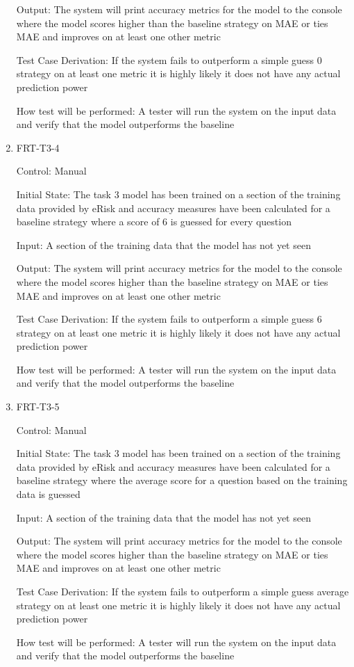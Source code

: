 \documentclass[12pt, titlepage]{article}
\begin{document}
\begin{enumerate}
Output: The system will print accuracy metrics for the model to the console where the model scores higher than the baseline strategy on MAE or ties MAE and improves on at least one other metric

Test Case Derivation: If the system fails to outperform a simple guess 0 strategy on at least one metric it is highly likely it does not have any actual prediction power

How test will be performed: A tester will run the system on the input data and verify that the model outperforms the baseline

\item{FRT-T3-4\\}

Control: Manual

Initial State: The task 3 model has been trained on a section of the training data provided by eRisk and accuracy measures have been calculated for a baseline strategy where a score of 6 is guessed for every question

Input: A section of the training data that the model has not yet seen

Output: The system will print accuracy metrics for the model to the console where the model scores higher than the baseline strategy on MAE or ties MAE and improves on at least one other metric

Test Case Derivation: If the system fails to outperform a simple guess 6 strategy on at least one metric it is highly likely it does not have any actual prediction power

How test will be performed: A tester will run the system on the input data and verify that the model outperforms the baseline

\item{FRT-T3-5\\}

Control: Manual

Initial State: The task 3 model has been trained on a section of the training data provided by eRisk and accuracy measures have been calculated for a baseline strategy where the average score for a question based on the training data is guessed

Input: A section of the training data that the model has not yet seen

Output: The system will print accuracy metrics for the model to the console where the model scores higher than the baseline strategy on MAE or ties MAE and improves on at least one other metric

Test Case Derivation: If the system fails to outperform a simple guess average strategy on at least one metric it is highly likely it does not have any actual prediction power

How test will be performed: A tester will run the system on the input data and verify that the model outperforms the baseline

\end{enumerate}
\end{document}
